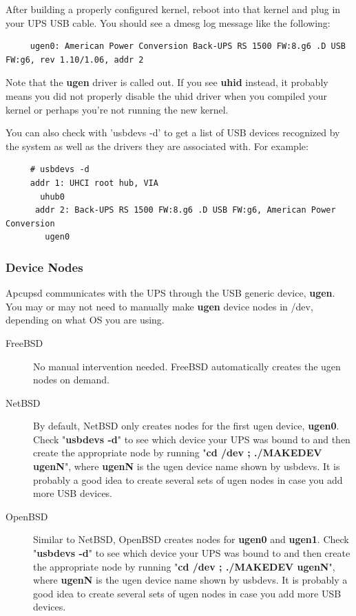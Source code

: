 After building a properly configured kernel, reboot into that kernel and plug
in your UPS USB cable. You should see a dmesg log message like the following: 

\begin{verbatim}
     ugen0: American Power Conversion Back-UPS RS 1500 FW:8.g6 .D USB FW:g6, rev 1.10/1.06, addr 2
\end{verbatim}

Note that the {\bf ugen} driver is called out. If you see {\bf uhid} instead, it
probably means you did not properly disable the uhid driver when you compiled
your kernel or perhaps you're not running the new kernel.

You can also check with 'usbdevs -d' to get a list of USB devices recognized
by the system as well as the drivers they are associated with. For example: 

\begin{verbatim}
     # usbdevs -d
     addr 1: UHCI root hub, VIA
       uhub0
      addr 2: Back-UPS RS 1500 FW:8.g6 .D USB FW:g6, American Power Conversion
        ugen0
\end{verbatim}

\subsubsection*{Device Nodes}

Apcupsd communicates with the UPS through the USB generic device, {\bf ugen}.
You may or may not need to manually make {\bf ugen} device nodes in /dev, 
depending on what OS you are using.  

\begin{description}
\item [FreeBSD]
No manual intervention needed. FreeBSD automatically creates the ugen
nodes on demand.

\item [NetBSD]
By default, NetBSD only creates nodes for the first ugen device, {\bf ugen0}.
Check "{\bf usbdevs -d}" to see which device your UPS was bound to and then
create the appropriate node by running "{\bf cd /dev ; ./MAKEDEV ugenN}",
where {\bf ugenN} is the ugen device name shown by usbdevs. It is probably
a good idea to create several sets of ugen nodes in case you add more USB
devices.

\item [OpenBSD]
Similar to NetBSD, OpenBSD creates nodes for {\bf ugen0} and {\bf ugen1}.
Check "{\bf usbdevs -d}" to see which device your UPS was bound to and then
create the appropriate node by running "{\bf cd /dev ; ./MAKEDEV ugenN}",
where {\bf ugenN} is the ugen device name shown by usbdevs. It is probably
a good idea to create several sets of ugen nodes in case you add more USB
devices.
\end{description}


